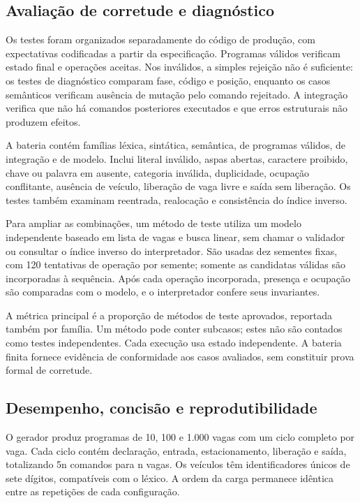 \documentclass[conference,a4paper]{IEEEtran}
\begin{document}
\subsection{Avaliação de corretude e diagnóstico}

Os testes foram organizados separadamente do código de produção, com expectativas codificadas a partir da especificação. Programas válidos verificam estado final e operações aceitas. Nos inválidos, a simples rejeição não é suficiente: os testes de diagnóstico comparam fase, código e posição, enquanto os casos semânticos verificam ausência de mutação pelo comando rejeitado. A integração verifica que não há comandos posteriores executados e que erros estruturais não produzem efeitos.


A bateria contém famílias léxica, sintática, semântica, de programas válidos, de integração e de modelo. Inclui literal inválido, aspas abertas, caractere proibido, chave ou palavra em ausente, categoria inválida, duplicidade, ocupação conflitante, ausência de veículo, liberação de vaga livre e saída sem liberação. Os testes também examinam reentrada, realocação e consistência do índice inverso.


Para ampliar as combinações, um método de teste utiliza um modelo independente baseado em lista de vagas e busca linear, sem chamar o validador ou consultar o índice inverso do interpretador. São usadas dez sementes fixas, com 120 tentativas de operação por semente; somente as candidatas válidas são incorporadas à sequência. Após cada operação incorporada, presença e ocupação são comparadas com o modelo, e o interpretador confere seus invariantes.


A métrica principal é a proporção de métodos de teste aprovados, reportada também por família. Um método pode conter subcasos; estes não são contados como testes independentes. Cada execução usa estado independente. A bateria finita fornece evidência de conformidade aos casos avaliados, sem constituir prova formal de corretude.


\subsection{Desempenho, concisão e reprodutibilidade}

O gerador produz programas de 10, 100 e 1.000 vagas com um ciclo completo por vaga. Cada ciclo contém declaração, entrada, estacionamento, liberação e saída, totalizando 5n comandos para n vagas. Os veículos têm identificadores únicos de sete dígitos, compatíveis com o léxico. A ordem da carga permanece idêntica entre as repetições de cada configuração.
\end{document}
